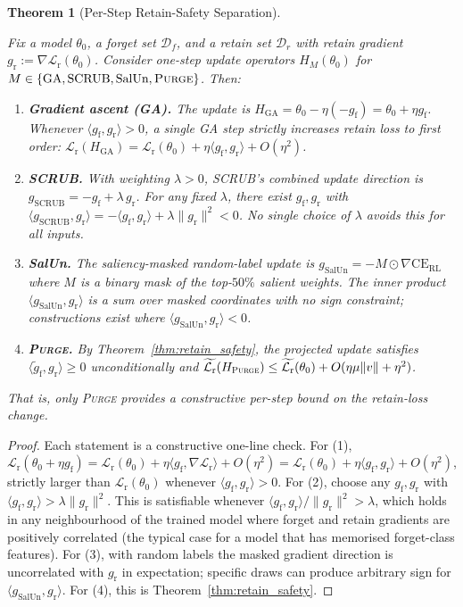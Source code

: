 \documentclass{article}
\newcommand{\ours}{\textsc{Purge}}
\newcommand{\CE}{\mathrm{CE}}
\newcommand{\Df}{\mathcal{D}_f}
\newcommand{\Dr}{\mathcal{D}_r}
\newcommand{\gf}{g_{\mathrm{f}}}
\newcommand{\gr}{g_{\mathrm{r}}}
\newcommand{\gproj}{\tilde{g}_{\mathrm{f}}}
\newcommand{\lossr}{\mathcal{L}_{\mathrm{r}}}
\newtheorem{theorem}{Theorem}
\newcommand{\new}[1]{{\color{orange}#1}}
\begin{document}
\begin{theorem}[Per-Step Retain-Safety Separation]
\label{thm:separation}
\new{Fix a model $\theta_0$, a forget set $\Df$, and a retain set $\Dr$ with retain gradient $\gr := \nabla\lossr(\theta_0)$. Consider one-step update operators $H_M(\theta_0)$ for $M\in\{\text{GA},\text{SCRUB},\text{SalUn},\ours{}\}$. Then:
\begin{enumerate}[nosep,leftmargin=*]
\item \textbf{Gradient ascent (GA).} The update is $H_{\text{GA}} = \theta_0 - \eta(-\gf) = \theta_0 + \eta\gf$. Whenever $\langle \gf, \gr\rangle > 0$, a single GA step strictly increases retain loss to first order: $\lossr(H_{\text{GA}}) = \lossr(\theta_0) + \eta\langle \gf,\gr\rangle + O(\eta^2)$.
\item \textbf{SCRUB.} With weighting $\lambda>0$, SCRUB's combined update direction is $g_{\text{SCRUB}} = -\gf + \lambda\,\gr$. For any fixed $\lambda$, there exist $\gf,\gr$ with $\langle g_{\text{SCRUB}}, \gr\rangle = -\langle\gf,\gr\rangle + \lambda\|\gr\|^2 < 0$. No \emph{single} choice of $\lambda$ avoids this for all inputs.
\item \textbf{SalUn.} The saliency-masked random-label update is $g_{\text{SalUn}} = -M\odot\nabla\CE_{\text{RL}}$ where $M$ is a binary mask of the top-$50\%$ salient weights. The inner product $\langle g_{\text{SalUn}},\gr\rangle$ is a sum over masked coordinates with no sign constraint; constructions exist where $\langle g_{\text{SalUn}}, \gr\rangle < 0$.
\item \textbf{\ours{}.} By Theorem~\ref{thm:retain_safety}, the projected update satisfies $\langle \gproj,\gr\rangle \ge 0$ unconditionally and $\widetilde{\lossr}(H_{\ours{}}) \le \widetilde{\lossr}(\theta_0) + O(\eta\mu\|v\| + \eta^2)$.
\end{enumerate}
That is, only \ours{} provides a constructive per-step bound on the retain-loss change.}
\end{theorem}

\begin{proof}
\new{Each statement is a constructive one-line check.
For (1), $\lossr(\theta_0 + \eta\gf) = \lossr(\theta_0) + \eta\langle\gf,\nabla\lossr\rangle + O(\eta^2) = \lossr(\theta_0) + \eta\langle\gf,\gr\rangle + O(\eta^2)$, strictly larger than $\lossr(\theta_0)$ whenever $\langle\gf,\gr\rangle>0$.
For (2), choose any $\gf,\gr$ with $\langle\gf,\gr\rangle > \lambda\|\gr\|^2$. This is satisfiable whenever $\langle\gf,\gr\rangle/\|\gr\|^2 > \lambda$, which holds in any neighbourhood of the trained model where forget and retain gradients are positively correlated (the typical case for a model that has memorised forget-class features).
For (3), with random labels the masked gradient direction is uncorrelated with $\gr$ in expectation; specific draws can produce arbitrary sign for $\langle g_{\text{SalUn}},\gr\rangle$.
For (4), this is Theorem~\ref{thm:retain_safety}.}
\end{proof}
\end{document}
